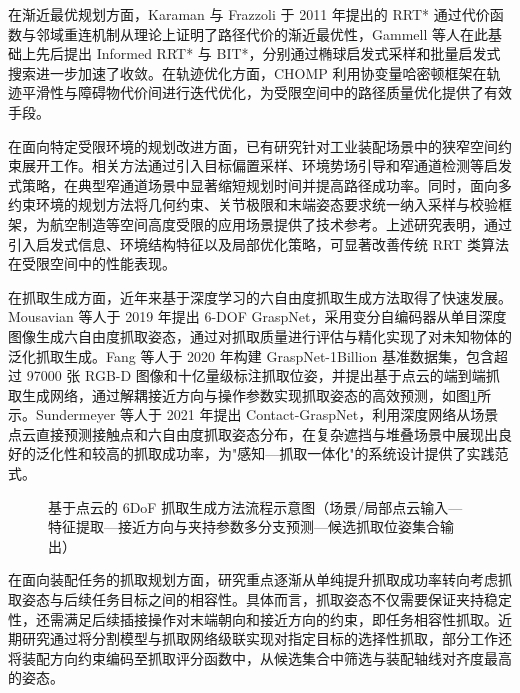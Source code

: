 在渐近最优规划方面，Karaman 与 Frazzoli 于 2011 年提出的 RRT*\cite{Karaman2011} 通过代价函数与邻域重连机制从理论上证明了路径代价的渐近最优性，Gammell 等人在此基础上先后提出 Informed RRT*\cite{Gammell2014} 与 BIT*\cite{Gammell2015}，分别通过椭球启发式采样和批量启发式搜索进一步加速了收敛。在轨迹优化方面，CHOMP\cite{Zucker2013} 利用协变量哈密顿框架在轨迹平滑性与障碍物代价间进行迭代优化，为受限空间中的路径质量优化提供了有效手段。

在面向特定受限环境的规划改进方面，已有研究针对工业装配场景中的狭窄空间约束展开工作。相关方法通过引入目标偏置采样、环境势场引导和窄通道检测等启发式策略，在典型窄通道场景中显著缩短规划时间并提高路径成功率。同时，面向多约束环境的规划方法将几何约束、关节极限和末端姿态要求统一纳入采样与校验框架，为航空制造等空间高度受限的应用场景提供了技术参考。上述研究表明，通过引入启发式信息、环境结构特征以及局部优化策略，可显著改善传统 RRT 类算法在受限空间中的性能表现。

在抓取生成方面，近年来基于深度学习的六自由度抓取生成方法取得了快速发展。Mousavian 等人于 2019 年提出 6-DOF GraspNet\cite{Mousavian2019}，采用变分自编码器从单目深度图像生成六自由度抓取姿态，通过对抓取质量进行评估与精化实现了对未知物体的泛化抓取生成。Fang 等人于 2020 年构建 GraspNet-1Billion 基准数据集\cite{Fang2020}，包含超过 97000 张 RGB-D 图像和十亿量级标注抓取位姿，并提出基于点云的端到端抓取生成网络，通过解耦接近方向与操作参数实现抓取姿态的高效预测，如图\ref{fig:ch1:grasp-gen}所示。Sundermeyer 等人于 2021 年提出 Contact-GraspNet\cite{Sundermeyer2021}，利用深度网络从场景点云直接预测接触点和六自由度抓取姿态分布，在复杂遮挡与堆叠场景中展现出良好的泛化性和较高的抓取成功率，为"感知—抓取一体化"的系统设计提供了实践范式。

\begin{figure}[htbp]
  \centering
  \caption{基于点云的 6DoF 抓取生成方法流程示意图（场景/局部点云输入—特征提取—接近方向与夹持参数多分支预测—候选抓取位姿集合输出）}
  \label{fig:ch1:grasp-gen}
\end{figure}

在面向装配任务的抓取规划方面，研究重点逐渐从单纯提升抓取成功率转向考虑抓取姿态与后续任务目标之间的相容性。具体而言，抓取姿态不仅需要保证夹持稳定性，还需满足后续插接操作对末端朝向和接近方向的约束，即任务相容性抓取。近期研究通过将分割模型与抓取网络级联实现对指定目标的选择性抓取，部分工作还将装配方向约束编码至抓取评分函数中，从候选集合中筛选与装配轴线对齐度最高的姿态。

